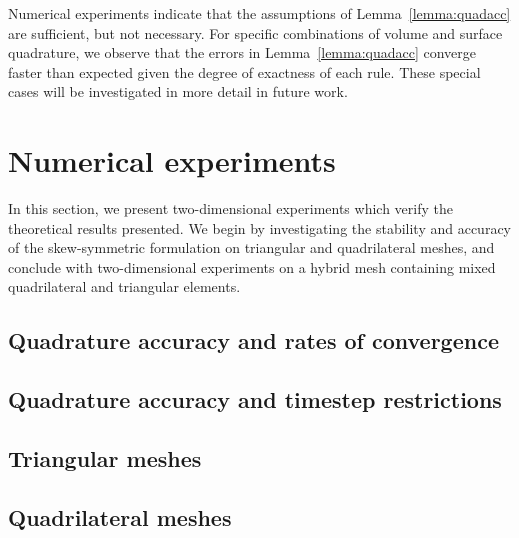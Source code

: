 \documentclass{svjour3}                     %
\renewcommand{\note}[1]{{\color{blue}{#1}}}
\begin{document}
\begin{remark}
Numerical experiments indicate that the assumptions of Lemma~\ref{lemma:quadacc} are sufficient, but not necessary.  For specific combinations of volume and surface quadrature, we observe that the errors in Lemma~\ref{lemma:quadacc} converge faster than expected given the degree of exactness of each rule.  These special cases will be investigated in more detail in future work.
\end{remark}

\section{Numerical experiments}
\label{sec:num}

In this section, we present two-dimensional experiments which verify the theoretical results presented.  We begin by investigating the stability and accuracy of the skew-symmetric formulation on triangular and quadrilateral meshes, and conclude with two-dimensional experiments on a hybrid mesh containing mixed quadrilateral and triangular elements.  

\subsection{Quadrature accuracy and rates of convergence}

\subsection{Quadrature accuracy and timestep restrictions}



\subsection{Triangular meshes}

\note{Affine and curved triangles with GLL surface quadrature (under-integrated).}

\subsection{Quadrilateral meshes}

\note{ GLL quadrilaterals with Gauss surface quadrature.  Explain that for GLL quadratures, the decoupled SBP property doesn't hold when Gauss points are used.  }
\end{document}
